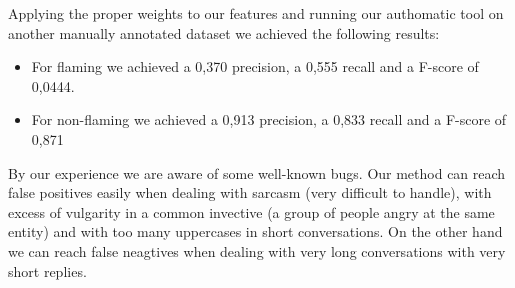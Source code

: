 \documentclass[a4paper,10pt, english]{report}
\begin{document}
Applying the proper weights to our features and running our authomatic tool on another manually annotated dataset we achieved the following results:
\begin{itemize}
 \item For flaming we achieved a 0,370 precision, a 0,555 recall and a F-score of 0,0444.
 \item For non-flaming we achieved a 0,913 precision, a 0,833 recall and a F-score of 0,871
\end{itemize}
By our experience we are aware of some well-known bugs. Our method can reach false positives easily when dealing with sarcasm (very difficult to handle), with excess of vulgarity in a common invective (a group of people angry at the same entity) and with too many uppercases in short conversations.
On the other hand we can reach false neagtives when dealing with very long conversations with very short replies.
\end{document}
